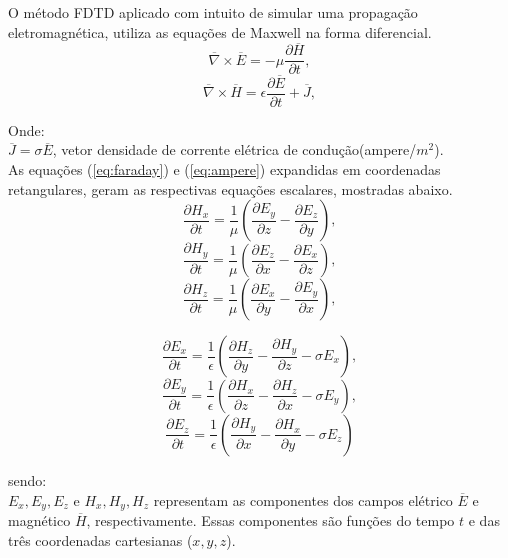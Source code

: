 O método FDTD aplicado com intuito de simular uma propagação eletromagnética, utiliza as equações de Maxwell na forma diferencial.
\begin{equation}\label{eq:faraday}
	\overline{\nabla}\times\overline{E}=-\mu\frac{\partial \overline{H}}{\partial t},
\end{equation}
\begin{equation}\label{eq:ampere}
		\overline{\nabla}\times\overline{H}=\epsilon\frac{\partial \overline{E}}{\partial t} + \overline{J},
\end{equation}
		
	Onde:\\
	$\overline{J} = \sigma\overline{E}$, vetor densidade de corrente elétrica  de condução(ampere/$m^{2}$).\\ 

As equações (\ref{eq:faraday}) e (\ref{eq:ampere}) expandidas em coordenadas retangulares, geram as respectivas equações escalares, mostradas abaixo.
\begin{equation}
	\frac{\partial H_x}{\partial t} = \frac{1}{\mu}(\frac{\partial E_y}{\partial z}-\frac{\partial E_z}{\partial y}),
\end{equation}
\begin{equation}
	\frac{\partial H_y}{\partial t} = \frac{1}{\mu}(\frac{\partial E_z}{\partial x}-\frac{\partial E_x}{\partial z}),
\end{equation}
\begin{equation}
	\frac{\partial H_z}{\partial t} = \frac{1}{\mu}(\frac{\partial E_x}{\partial y}-\frac{\partial E_y}{\partial x}),
\end{equation}

\begin{equation}
	\frac{\partial E_x}{\partial t} = \frac{1}{\epsilon}(\frac{\partial H_z}{\partial y}-\frac{\partial H_y}{\partial z} -\sigma E_x),
\end{equation}
\begin{equation}
	\frac{\partial E_y}{\partial t} = \frac{1}{\epsilon}(\frac{\partial H_x}{\partial z}-\frac{\partial H_z}{\partial x} -\sigma E_y),
\end{equation}
\begin{equation}
	\frac{\partial E_z}{\partial t} = \frac{1}{\epsilon}(\frac{\partial H_y}{\partial x}-\frac{\partial H_x}{\partial y} -\sigma E_z)
\end{equation}

sendo:\\
$E_x, E_y, E_z$ e $H_x, H_y, H_z$ representam as componentes dos campos elétrico $\overline{E}$ e magnético $\overline{H}$, respectivamente. Essas componentes são funções do tempo $t$ e das três coordenadas cartesianas ($x,y,z$).\\

